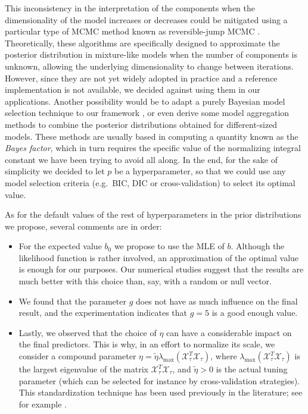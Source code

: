 This inconsistency in the interpretation of the components when the dimensionality of the model increases or decreases could be mitigated using a particular type of MCMC method known as reversible-jump MCMC \citep{green1995reversible}. Theoretically, these algorithms are specifically designed to approximate the posterior distribution in mixture-like models when the number of components is unknown, allowing the underlying dimensionality to change between iterations. However, since they are not yet widely adopted in practice and a reference implementation is not available, we decided against using them in our applications. Another possibility would be to adapt a purely Bayesian model selection technique to our framework \citep[see][]{piironen2017comparison, gelman2013bayesian}, or even derive some model aggregation methods to combine the posterior distributions obtained for different-sized models. These methods are usually based in computing a quantity known as the \textit{Bayes factor}, which in turn requires the specific value of the normalizing integral constant we have been trying to avoid all along. In the end, for the sake of simplicity we decided to let \(p\) be a hyperparameter, so that we could use any model selection criteria (e.g.\ BIC, DIC or cross-validation) to select its optimal value.

As for the default values of the rest of hyperparameters in the prior distributions we propose, several comments are in order:
\begin{itemize}
    \item For the expected value \(b_0\) we propose to use the MLE of \(b\). Although the likelihood function is rather involved, an approximation of the optimal value is enough for our purposes. Our numerical studies suggest that the results are much better with this choice than, say, with a random or null vector.
    \item We found that the parameter \(g\) does not have as much influence on the final result, and the experimentation indicates that \(g=5\) is a good enough value.
    \item Lastly, we observed that the choice of \(\eta\) can have a considerable impact on the final predictors. This is why, in an effort to normalize its scale, we consider a compound parameter \(\eta = \tilde \eta \lambda_{\max}(\mathcal X_\tau^T \mathcal X_\tau)\), where \(\lambda_{\max}(\mathcal X_\tau^T \mathcal X_\tau)\) is the largest eigenvalue of the matrix \(\mathcal X_\tau^T \mathcal X_\tau\), and \(\tilde\eta > 0\) is the actual tuning parameter (which can be selected for instance by cross-validation strategies). This standardization technique has been used previously in the literature; see for example \citet{grollemund2019bayesian}.
\end{itemize}

